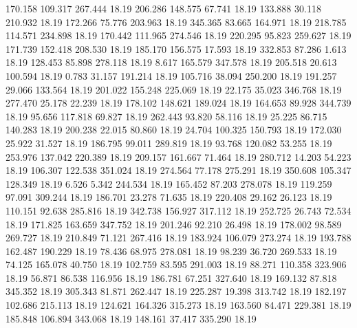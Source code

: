  170.158  109.317  267.444        18.19
 206.286  148.575   67.741        18.19
 133.888   30.118  210.932        18.19
 172.266   75.776  203.963        18.19
 345.365   83.665  164.971        18.19
 218.785  114.571  234.898        18.19
 170.442  111.965  274.546        18.19
 220.295   95.823  259.627        18.19
 171.739  152.418  208.530        18.19
 185.170  156.575   17.593        18.19
 332.853   87.286    1.613        18.19
 128.453   85.898  278.118        18.19
   8.617  165.579  347.578        18.19
 205.518   20.613  100.594        18.19
   0.783   31.157  191.214        18.19
 105.716   38.094  250.200        18.19
 191.257   29.066  133.564        18.19
 201.022  155.248  225.069        18.19
  22.175   35.023  346.768        18.19
 277.470   25.178   22.239        18.19
 178.102  148.621  189.024        18.19
 164.653   89.928  344.739        18.19
  95.656  117.818   69.827        18.19
 262.443   93.820   58.116        18.19
  25.225   86.715  140.283        18.19
 200.238   22.015   80.860        18.19
  24.704  100.325  150.793        18.19
 172.030   25.922   31.527        18.19
 186.795   99.011  289.819        18.19
  93.768  120.082   53.255        18.19
 253.976  137.042  220.389        18.19
 209.157  161.667   71.464        18.19
 280.712   14.203   54.223        18.19
 106.307  122.538  351.024        18.19
 274.564   77.178  275.291        18.19
 350.608  105.347  128.349        18.19
   6.526    5.342  244.534        18.19
 165.452   87.203  278.078        18.19
 119.259   97.091  309.244        18.19
 186.701   23.278   71.635        18.19
 220.408   29.162   26.123        18.19
 110.151   92.638  285.816        18.19
 342.738  156.927  317.112        18.19
 252.725   26.743   72.534        18.19
 171.825  163.659  347.752        18.19
 201.246   92.210   26.498        18.19
 178.002   98.589  269.727        18.19
 210.849   71.121  267.416        18.19
 183.924  106.079  273.274        18.19
 193.788  162.487  190.229        18.19
  78.436   68.975  278.081        18.19
  98.239   36.720  269.533        18.19
  74.125  165.078   40.750        18.19
 102.759   83.595  291.003        18.19
  88.271  110.358  323.906        18.19
  56.871   86.538  116.956        18.19
 186.781   67.251  327.640        18.19
 169.132   87.818  345.352        18.19
 305.343   81.871  262.447        18.19
 225.287   19.398  313.742        18.19
 182.197  102.686  215.113        18.19
 124.621  164.326  315.273        18.19
 163.560   84.471  229.381        18.19
 185.848  106.894  343.068        18.19
 148.161   37.417  335.290        18.19
